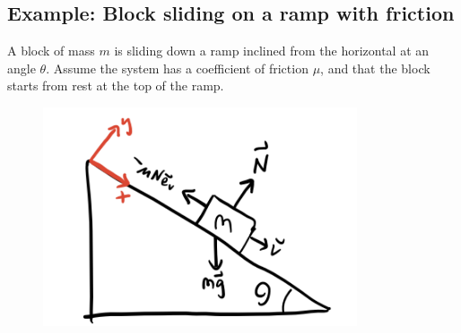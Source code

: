 \documentclass[
  letterpaper,
  DIV=11,
  numbers=noendperiod]{scrreprt}
\begin{document}
\hypertarget{example-block-sliding-on-a-ramp-with-friction}{%
\subsection{Example: Block sliding on a ramp with
friction}\label{example-block-sliding-on-a-ramp-with-friction}}

A block of mass \(m\) is sliding down a ramp inclined from the
horizontal at an angle \(\theta\). Assume the system has a coefficient
of friction \(\mu\), and that the block starts from rest at the top of
the ramp.

\begin{figure}

{\centering \includegraphics[width=3.64583in,height=\textheight]{classical-mechanics/./resources/image-20230212033443698.png}

}

\end{figure}
\end{document}
